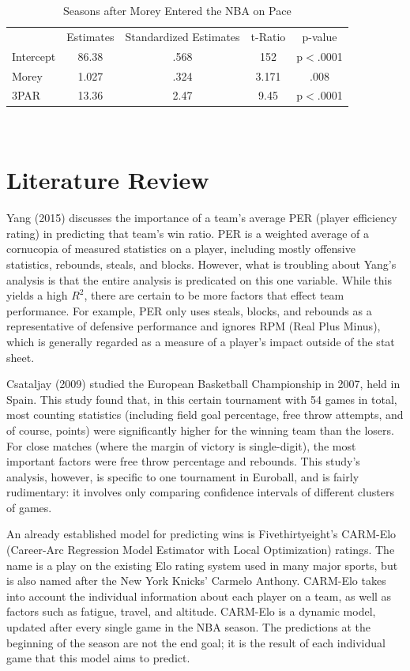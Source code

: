 \documentclass[12pt]{article}
\begin{document}
 \begin{table}[ht]
\def\tablename{Model}
\caption{Seasons after Morey Entered the NBA on Pace}
\centering
\begin{tabular}{lcccc}
\hline \hline
& Estimates  &  Standardized Estimates  &  t-Ratio  &  p-value  \\
Intercept & 86.38 & .568 & 152 & p$<$.0001\\
Morey & 1.027 & .324 & 3.171 & .008\\
3PAR & 13.36 & 2.47 & 9.45 & p$<$.0001\\

\end{tabular}
\\ 
\end{table}

\section{Literature Review}
Yang (2015) discusses the importance of a team's average PER (player efficiency rating) in predicting that team's win ratio. PER is a weighted average of a cornucopia of measured statistics on a player, including mostly offensive statistics, rebounds, steals, and blocks. However, what is troubling about Yang's analysis is that the entire analysis is predicated on this one variable. While this yields a high $R^2$, there are certain to be more factors that effect team performance. For example, PER only uses steals, blocks, and rebounds as a representative of defensive performance and ignores RPM (Real Plus Minus), which is generally regarded as a measure of a player's impact outside of the stat sheet.\par
Csataljay (2009) studied the European Basketball Championship in 2007, held in Spain. This study found that, in this certain tournament with 54 games in total, most counting statistics (including field goal percentage, free throw attempts, and of course, points) were significantly higher for the winning team than the losers. For close matches (where the margin of victory is single-digit), the most important factors were free throw percentage and rebounds. This study's analysis, however, is specific to one tournament in Euroball, and is fairly rudimentary: it involves only comparing confidence intervals of different clusters of games.\par
An already established model for predicting wins is Fivethirtyeight's CARM-Elo (Career-Arc Regression Model Estimator with Local Optimization) ratings. The name is a play on the existing Elo rating system used in many major sports, but is also named after the New York Knicks' Carmelo Anthony. CARM-Elo takes into account the individual information about each player on a team, as well as factors such as fatigue, travel, and altitude. CARM-Elo is a dynamic model, updated after every single game in the NBA season. The predictions at the beginning of the season are not the end goal; it is the result of each individual game that this model aims to predict.\par
        	 
\end{document}
